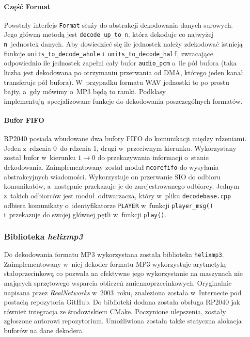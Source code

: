 \documentclass[polish]{aghengthesis}
\begin{document}
			\paragraph{Część Format}
				Powstały interfejs \lstinline|Format| służy do abstrakcji dekodowania danych surowych. Jego główną metodą jest \lstinline|decode_up_to_n|, która dekoduje co najwyżej \lstinline|n|~jednostek danych. Aby dowiedzieć się ile jednostek należy zdekodować istnieją funkcje \lstinline|units_to_decode_whole| i~\lstinline|units_to_decode_half|, zwracające odpowiednio ile jednostek zapełni cały bufor \lstinline|audio_pcm| a~ile pół bufora (taka liczba jest dekodowana po otrzymaniu przerwania od DMA, którego jeden kanał transferuje pół bufora). W~przypadku formatu WAV jednostki to po prostu bajty, a~gdy mówimy o~MP3 będą to ramki. Podklasy implementują specjalizowane funkcje do dekodowania poszczególnych formatów.
			
			\paragraph{Bufor FIFO}
				RP2040 posiada wbudowane dwa bufory FIFO do komunikacji między rdzeniami. Jeden z~rdzenia 0~do rdzenia 1, drugi w~przeciwnym kierunku. Wykorzystany został bufor w~kierunku $1 \rightarrow 0$ do przekazywania informacji o~stanie dekodowania. Zaimplementowany został moduł \lstinline|mcorefifo| do wysyłania abstrakcyjnych wiadomości. Wykorzystuje on przerwanie SIO do odbioru komunikatów, a~następnie przekazuje je do zarejestrowanego odbiorcy. Jednym z~takich odbiorców jest moduł odtwarzacza, który w~pliku \lstinline|decodebase.cpp| odbiera komunikaty o~identyfikatorze \lstinline|PLAYER| w~funkcji \lstinline|player_msg()| i~przekazuje do swojej głównej pętli w~funkcji \lstinline|play()|.
		
		\subsubsection{Biblioteka \textit{helixmp3}}
			Do dekodowania formatu MP3 wykorzystana została biblioteka \lstinline|helixmp3|.
			Zaimplementowany w~niej dekoder formatu MP3 wykorzystuje arytmetykę stałoprzecinkową co pozwala na efektywne jego wykorzystanie na maszynach nie mających sprzętowego wsparcia obliczeń zmiennoprzecinkowych.
			Oryginalnie napisana przez \textit{RealNetworks}\textsuperscript{\cite{realnetworks}} w~2003~roku, znaleziona została w~Internecie pod postacią repozytoria GitHub\textsuperscript{\cite{helixmp3_repo}}. Do biblioteki dodana została obsługa RP2040 jak również integracja ze środowiskiem CMake.
			Poczynione ulepszenia, zostały zgłoszone autorowi repozytorium\textsuperscript{\cite{helixmp3_pr}}. Umożliwiona została także statyczna alokacja buforów na dane dekodera.
			$ $\\
			
\end{document}
